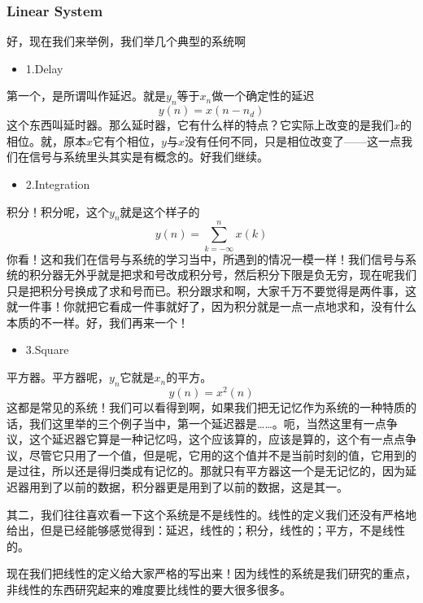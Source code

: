 \documentclass[a4paper,12pt]{article}
\begin{document}
\subsubsection{Linear System}\quad

好，现在我们来举例，我们举几个典型的系统啊
\begin{itemize}
    \item 1.\quad Delay
\end{itemize}
第一个，是所谓叫作延迟。就是$y_n$等于$x_n$做一个确定性的延迟
\begin{equation}
    y(n) =  x(n-n_d)
\end{equation}
这个东西叫延时器。那么延时器，它有什么样的特点？它实际上改变的是我们$x$的相位。就，原本$x$它有个相位，$y$与$x$没有任何不同，只是相位改变了——这一点我们在信号与系统里头其实是有概念的。好我们继续。
\begin{itemize}
    \item 2.\quad Integration
\end{itemize}
积分！积分呢，这个$y_n$就是这个样子的
\begin{equation}
    y(n) =  \sum^{n}_{k=-\infty}x(k)
\end{equation}
你看！这和我们在信号与系统的学习当中，所遇到的情况一模一样！我们信号与系统的积分器无外乎就是把求和号改成积分号，然后积分下限是负无穷，现在呢我们只是把积分号换成了求和号而已。积分跟求和啊，大家千万不要觉得是两件事，这就一件事！你就把它看成一件事就好了，因为积分就是一点一点地求和，没有什么本质的不一样。好，我们再来一个！
\begin{itemize}
    \item 3.\quad Square
\end{itemize}
平方器。平方器呢，$y_n$它就是$x_n$的平方。
\begin{equation}
    y(n) =  x^2(n)
\end{equation}
这都是常见的系统！我们可以看得到啊，如果我们把无记忆作为系统的一种特质的话，我们这里举的三个例子当中，第一个延迟器是……。呃，当然这里有一点争议，这个延迟器它算是一种记忆吗，这个应该算的，应该是算的，这个有一点点争议，尽管它只用了一个值，但是呢，它用的这个值并不是当前时刻的值，它用到的是过往，所以还是得归类成有记忆的。那就只有平方器这一个是无记忆的，因为延迟器用到了以前的数据，积分器更是用到了以前的数据，这是其一。


其二，我们往往喜欢看一下这个系统是不是线性的。线性的定义我们还没有严格地给出，但是已经能够感觉得到：延迟，线性的；积分，线性的；平方，不是线性的。

现在我们把线性的定义给大家严格的写出来！因为线性的系统是我们研究的重点，非线性的东西研究起来的难度要比线性的要大很多很多。
\end{document}

